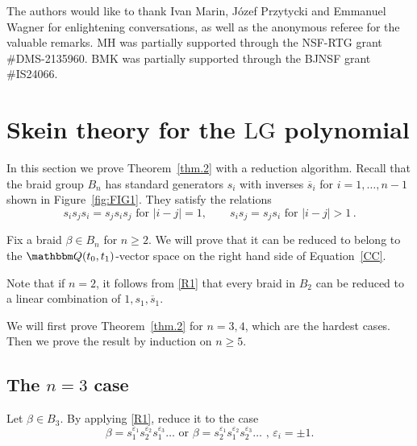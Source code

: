 \documentclass[12pt,reqno]{amsart}
\theoremstyle{definition}
\def\BQ{\mathbbm Q}
\def\be{\begin{equation}}
\def\ee{\end{equation}}
\def\hs{\overline{s}}
\def\LG{\mathrm{LG}}
\begin{document}
The authors would like to thank Ivan Marin, J\'{o}zef Przytycki and Emmanuel Wagner
for enlightening conversations, as well as the anonymous referee for the valuable remarks. MH was partially supported through the NSF-RTG grant
\#DMS-2135960. BMK was partially supported through the BJNSF grant \#IS24066.


\section{Skein theory for the \texorpdfstring{$\LG$}{LG} polynomial}
\label{sec.skein}

In this section we prove Theorem~\ref{thm.2} with a reduction algorithm.
Recall that the braid group $B_n$ has standard generators 
$s_i$ with inverses $\hs_i$ for $i=1,\dots,n-1$ shown in Figure~\ref{fig:FIG1}.
They satisfy the relations
\be
s_i s_j s_i = s_j s_i s_j\,\,\mbox{for } |i-j|=1,
\qquad s_i s_j = s_j s_i \,\,\mbox{for } |i-j|>1 \,.
\ee

Fix a braid $\beta \in B_n$ for $n \geq 2$. We will prove that it can be reduced
to belong to the $\BQ(t_0,t_1)$-vector space on the right hand side of Equation~\eqref{CC}.

Note that if $n=2$, it follows from \eqref{R1} that every braid in $B_2$ can
be reduced to a linear combination of $1, s_1, \hs_1$.

We will first prove Theorem~\ref{thm.2} for $n = 3, 4$, which are the hardest cases.
Then we prove the result by induction on $n \geq 5$.

\subsection{The \texorpdfstring{$n=3$}{n = 3} case}

Let $\beta \in B_3$. By applying \eqref{R1}, reduce it to the case 
\be
\beta = s_1^{\varepsilon_1} s_2^{\varepsilon_2} s_1^{\varepsilon_3}
\ldots \text{ or } \beta = s_2^{\varepsilon_1} s_1^{\varepsilon_2}
s_2^{\varepsilon_3} \ldots \text{ , } \varepsilon_i = \pm 1.
\ee
\end{document}
